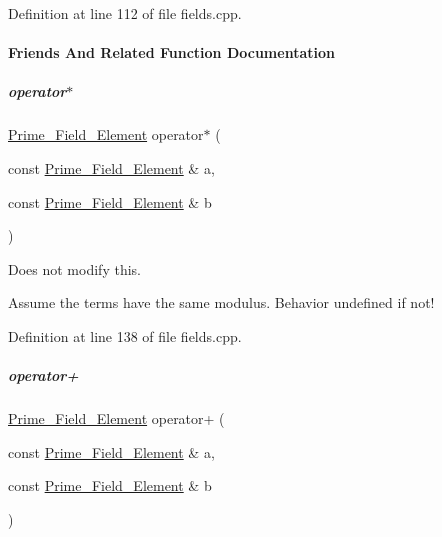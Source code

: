 Definition at line 112 of file fields.\+cpp.



\paragraph{Friends And Related Function Documentation}
\mbox{\label{group___fields_group_a33507738ef00abb43ae64c900f7b807a}} 
\subparagraph{\texorpdfstring{operator$\ast$}{operator*}}
{\footnotesize\ttfamily \hyperlink{group___fields_group_class_prime___field___element}{Prime\+\_\+\+Field\+\_\+\+Element} operator$\ast$ (\begin{DoxyParamCaption}\item[{const \hyperlink{group___fields_group_class_prime___field___element}{Prime\+\_\+\+Field\+\_\+\+Element} \&}]{a,  }\item[{const \hyperlink{group___fields_group_class_prime___field___element}{Prime\+\_\+\+Field\+\_\+\+Element} \&}]{b }\end{DoxyParamCaption})\hspace{0.3cm}{\ttfamily [friend]}}



Does not modify {\ttfamily this}. 

Assume the terms have the same modulus. Behavior undefined if not! 

Definition at line 138 of file fields.\+cpp.

\mbox{\label{group___fields_group_af379d31756ccc09650e204aaa7dc1dd2}} 
\subparagraph{\texorpdfstring{operator+}{operator+}}
{\footnotesize\ttfamily \hyperlink{group___fields_group_class_prime___field___element}{Prime\+\_\+\+Field\+\_\+\+Element} operator+ (\begin{DoxyParamCaption}\item[{const \hyperlink{group___fields_group_class_prime___field___element}{Prime\+\_\+\+Field\+\_\+\+Element} \&}]{a,  }\item[{const \hyperlink{group___fields_group_class_prime___field___element}{Prime\+\_\+\+Field\+\_\+\+Element} \&}]{b }\end{DoxyParamCaption})\hspace{0.3cm}{\ttfamily [friend]}}



